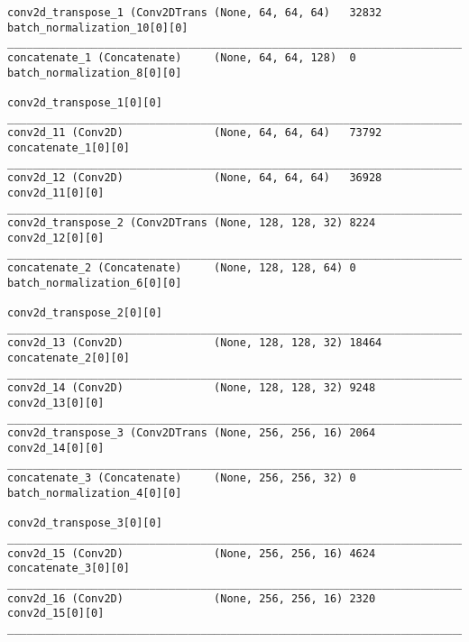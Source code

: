 \begin{verbatim}
conv2d_transpose_1 (Conv2DTrans (None, 64, 64, 64)   32832       batch_normalization_10[0][0]     
__________________________________________________________________________________________________
concatenate_1 (Concatenate)     (None, 64, 64, 128)  0           batch_normalization_8[0][0]      
                                                                 conv2d_transpose_1[0][0]         
__________________________________________________________________________________________________
conv2d_11 (Conv2D)              (None, 64, 64, 64)   73792       concatenate_1[0][0]              
__________________________________________________________________________________________________
conv2d_12 (Conv2D)              (None, 64, 64, 64)   36928       conv2d_11[0][0]                  
__________________________________________________________________________________________________
conv2d_transpose_2 (Conv2DTrans (None, 128, 128, 32) 8224        conv2d_12[0][0]                  
__________________________________________________________________________________________________
concatenate_2 (Concatenate)     (None, 128, 128, 64) 0           batch_normalization_6[0][0]      
                                                                 conv2d_transpose_2[0][0]         
__________________________________________________________________________________________________
conv2d_13 (Conv2D)              (None, 128, 128, 32) 18464       concatenate_2[0][0]              
__________________________________________________________________________________________________
conv2d_14 (Conv2D)              (None, 128, 128, 32) 9248        conv2d_13[0][0]                  
__________________________________________________________________________________________________
conv2d_transpose_3 (Conv2DTrans (None, 256, 256, 16) 2064        conv2d_14[0][0]                  
__________________________________________________________________________________________________
concatenate_3 (Concatenate)     (None, 256, 256, 32) 0           batch_normalization_4[0][0]      
                                                                 conv2d_transpose_3[0][0]         
__________________________________________________________________________________________________
conv2d_15 (Conv2D)              (None, 256, 256, 16) 4624        concatenate_3[0][0]              
__________________________________________________________________________________________________
conv2d_16 (Conv2D)              (None, 256, 256, 16) 2320        conv2d_15[0][0]                  
__________________________________________________________________________________________________

\end{verbatim}

